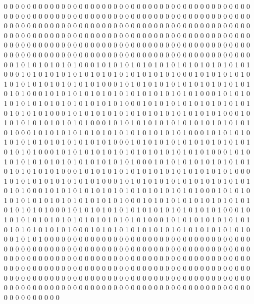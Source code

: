 0 0 0 0 0 0 0 0 0 0 0 0 0 0 0 0 0 0 0 0 0 0 0 0 0 0 0 0 0 0 0 0 0 0 0 0 0 0 0 0 0 0 0 0 0 0 0 0 0 0 0 0 0 0 0 0 0 0 0 0 0 0 0 0 0 0 0 0 0 0 0 0 0 0 0 0 0 0 0 0 0 0 0 0 0 0 0 0 0 0 0 0 0 0 0 0 0 0 0 0 0 0 0 0 0 0 0 0 0 0 0 0 0 0 0 0 0 0 0 0 0 0 0 0 0 0 0 0 0 0 0 0 0 0 0 0 0 0 0 0 0 0 0 0 0 0 0 0 0 0 0 0 0 0 0 0 0 0 0 0 0 0 0 0 0 0 0 0 0 0 0 0 0 0 0 0 0 0 0 0 0 0 0 0 0 0 0 0 0 0 0 0 0 0 0 0 0 0 0 0 0 0 0 0 0 0 0 0 0 0 0 0 0 0 0 0 0 0 0 0 0 0 0 0 0 0 0 0 0 0 0 0 0 0 0 0 0 0 0 0 0 0 0 0 0 0 0 0 0 0 0 0 0 0 0 0 0 0 0 0 
1 0 1 0 1 0 1 0 1 0 1 0 0 0 1 0 1 0 1 0 1 0 1 0 1 0 1 0 1 0 1 0 1 0 1 0 1 0 1 0 1 0 0 0 1 0 1 0 1 0 1 0 1 0 1 0 1 0 1 0 1 0 1 0 1 0 1 0 1 0 1 0 0 0 1 0 1 0 1 0 1 0 1 0 1 0 1 0 1 0 1 0 1 0 1 0 1 0 1 0 1 0 0 0 1 0 1 0 1 0 1 0 1 0 1 0 1 0 1 0 1 0 1 0 1 0 1 0 1 0 1 0 0 0 1 0 1 0 1 0 1 0 1 0 1 0 1 0 1 0 1 0 1 0 1 0 1 0 1 0 1 0 0 0 1 0 1 0 1 0 1 0 1 0 1 0 1 0 1 0 1 0 1 0 1 0 1 0 1 0 1 0 0 0 1 0 1 0 1 0 1 0 1 0 1 0 1 0 1 0 1 0 1 0 1 0 1 0 1 0 1 0 0 0 1 0 1 0 1 0 1 0 1 0 1 0 1 0 1 0 1 0 1 0 1 0 1 0 1 0 1 0 0 0 1 0 1 0 1 0 
1 0 1 0 1 0 1 0 1 0 1 0 0 0 1 0 1 0 1 0 1 0 1 0 1 0 1 0 1 0 1 0 1 0 1 0 1 0 1 0 1 0 0 0 1 0 1 0 1 0 1 0 1 0 1 0 1 0 1 0 1 0 1 0 1 0 1 0 1 0 1 0 0 0 1 0 1 0 1 0 1 0 1 0 1 0 1 0 1 0 1 0 1 0 1 0 1 0 1 0 1 0 0 0 1 0 1 0 1 0 1 0 1 0 1 0 1 0 1 0 1 0 1 0 1 0 1 0 1 0 1 0 0 0 1 0 1 0 1 0 1 0 1 0 1 0 1 0 1 0 1 0 1 0 1 0 1 0 1 0 1 0 0 0 1 0 1 0 1 0 1 0 1 0 1 0 1 0 1 0 1 0 1 0 1 0 1 0 1 0 1 0 0 0 1 0 1 0 1 0 1 0 1 0 1 0 1 0 1 0 1 0 1 0 1 0 1 0 1 0 1 0 0 0 1 0 1 0 1 0 1 0 1 0 1 0 1 0 1 0 1 0 1 0 1 0 1 0 1 0 1 0 0 0 1 0 1 0 1 0 
1 0 1 0 1 0 1 0 1 0 1 0 0 0 1 0 1 0 1 0 1 0 1 0 1 0 1 0 1 0 1 0 1 0 1 0 1 0 1 0 1 0 0 0 1 0 1 0 1 0 1 0 1 0 1 0 1 0 1 0 1 0 1 0 1 0 1 0 1 0 1 0 0 0 1 0 1 0 1 0 1 0 1 0 1 0 1 0 1 0 1 0 1 0 1 0 1 0 1 0 1 0 0 0 1 0 1 0 1 0 1 0 1 0 1 0 1 0 1 0 1 0 1 0 1 0 1 0 1 0 1 0 0 0 1 0 1 0 1 0 1 0 1 0 1 0 1 0 1 0 1 0 1 0 1 0 1 0 1 0 1 0 0 0 1 0 1 0 1 0 1 0 1 0 1 0 1 0 1 0 1 0 1 0 1 0 1 0 1 0 1 0 0 0 1 0 1 0 1 0 1 0 1 0 1 0 1 0 1 0 1 0 1 0 1 0 1 0 1 0 1 0 0 0 1 0 1 0 1 0 1 0 1 0 1 0 1 0 1 0 1 0 1 0 1 0 1 0 1 0 1 0 0 0 1 0 1 0 1 0 
0 0 0 0 0 0 0 0 0 0 0 0 0 0 0 0 0 0 0 0 0 0 0 0 0 0 0 0 0 0 0 0 0 0 0 0 0 0 0 0 0 0 0 0 0 0 0 0 0 0 0 0 0 0 0 0 0 0 0 0 0 0 0 0 0 0 0 0 0 0 0 0 0 0 0 0 0 0 0 0 0 0 0 0 0 0 0 0 0 0 0 0 0 0 0 0 0 0 0 0 0 0 0 0 0 0 0 0 0 0 0 0 0 0 0 0 0 0 0 0 0 0 0 0 0 0 0 0 0 0 0 0 0 0 0 0 0 0 0 0 0 0 0 0 0 0 0 0 0 0 0 0 0 0 0 0 0 0 0 0 0 0 0 0 0 0 0 0 0 0 0 0 0 0 0 0 0 0 0 0 0 0 0 0 0 0 0 0 0 0 0 0 0 0 0 0 0 0 0 0 0 0 0 0 0 0 0 0 0 0 0 0 0 0 0 0 0 0 0 0 0 0 0 0 0 0 0 0 0 0 0 0 0 0 0 0 0 0 0 0 0 0 0 0 0 0 0 0 0 0 0 0 0 0 0 0 0 0 0 0 
